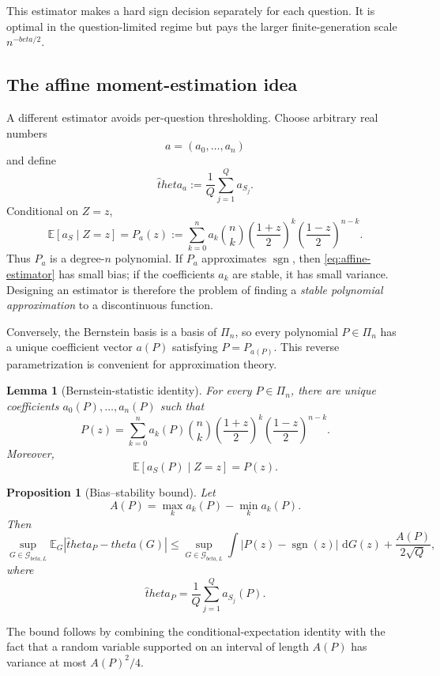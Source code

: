 \documentclass[11pt]{article}
\def\beta{beta}%
\def\theta{theta}%
\newtheorem{proposition}[theorem]{Proposition}
\newtheorem{lemma}[theorem]{Lemma}
\newcommand{\E}{\mathbb E}
\newcommand{\sgn}{\operatorname{sgn}}
\newcommand{\calG}{\mathcal G}
\newcommand{\dd}{\,\mathrm d}
\begin{document}
This estimator makes a hard sign decision separately for each question.  It is optimal in the question-limited regime but pays the larger finite-generation scale $n^{-\beta/2}$.

\subsection{The affine moment-estimation idea}

A different estimator avoids per-question thresholding.  Choose arbitrary real numbers
\[
a=(a_0,\dots,a_n)
\]
and define
\begin{equation}
\label{eq:affine-estimator}
\widehat\theta_a
:=
\frac1Q\sum_{j=1}^Q a_{S_j}.
\end{equation}
Conditional on $Z=z$,
\begin{equation}
\label{eq:Pa}
\E[a_S\mid Z=z]
=
P_a(z)
:=
\sum_{k=0}^n a_k
\binom nk
\left(\frac{1+z}{2}\right)^k
\left(\frac{1-z}{2}\right)^{n-k}.
\end{equation}
Thus $P_a$ is a degree-$n$ polynomial.  If $P_a$ approximates $\sgn$, then \eqref{eq:affine-estimator} has small bias; if the coefficients $a_k$ are stable, it has small variance.  Designing an estimator is therefore the problem of finding a \emph{stable polynomial approximation} to a discontinuous function.

Conversely, the Bernstein basis is a basis of $\Pi_n$, so every polynomial $P\in\Pi_n$ has a unique coefficient vector $a(P)$ satisfying $P=P_{a(P)}$.  This reverse parametrization is convenient for approximation theory.

\begin{lemma}[Bernstein-statistic identity]
\label{lem:bernstein-identity}
For every $P\in\Pi_n$, there are unique coefficients $a_0(P),\dots,a_n(P)$ such that
\begin{equation}
\label{eq:bernstein-representation}
P(z)
=
\sum_{k=0}^n a_k(P)
\binom nk
\left(\frac{1+z}{2}\right)^k
\left(\frac{1-z}{2}\right)^{n-k}.
\end{equation}
Moreover,
\[
\E[a_S(P)\mid Z=z]=P(z).
\]
\end{lemma}

\begin{proposition}[Bias--stability bound]
\label{prop:bias-stability}
Let
\[
A(P)=\max_k a_k(P)-\min_k a_k(P).
\]
Then
\begin{equation}
\label{eq:bias-stability}
\sup_{G\in\calG_{\beta,L}}
\E_G|\widehat\theta_P-\theta(G)|
\le
\sup_{G\in\calG_{\beta,L}}
\int|P(z)-\sgn(z)|\,\dd G(z)
+
\frac{A(P)}{2\sqrt Q},
\end{equation}
where
\[
\widehat\theta_P=\frac1Q\sum_{j=1}^Q a_{S_j}(P).
\]
\end{proposition}
The bound follows by combining the conditional-expectation identity with the fact that a random variable supported on an interval of length $A(P)$ has variance at most $A(P)^2/4$.
\end{document}
